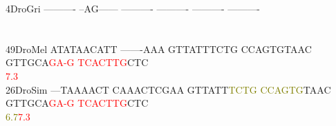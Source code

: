 \documentclass[11pt,twoside,reqno,a4paper]{article}
\begin{document}
{4\hspace*{3\charwidth}DroGri	----------	--AG------	----------	----------	----------	----------	\\
\hspace*{4\charwidth}\hspace*{7\charwidth}\hspace*{1\charwidth}\hspace*{1\charwidth}\hspace*{1\charwidth}\hspace*{1\charwidth}\hspace*{1\charwidth}\hspace*{1\charwidth}\\
\\
49\hspace*{2\charwidth}DroMel	ATATAACATT	-------AAA	GTTATTTCTG	CCAGTGTAAC	GTTGCA\textcolor{red}{G}\textcolor{red}{A}\textcolor{red}{-}\textcolor{red}{G}	\textcolor{red}{T}\textcolor{red}{C}\textcolor{red}{A}\textcolor{red}{C}\textcolor{red}{T}\textcolor{red}{T}\textcolor{red}{G}CTC	\\
\hspace*{4\charwidth}\hspace*{7\charwidth}\hspace*{1\charwidth}\hspace*{1\charwidth}\hspace*{1\charwidth}\hspace*{1\charwidth}\hspace*{46\charwidth}\textcolor{red}{7.3}\hspace*{1\charwidth}\hspace*{1\charwidth}\\
26\hspace*{2\charwidth}DroSim	---TAAAACT	CAAACTCGAA	GTTATT\textcolor{olive}{T}\textcolor{olive}{C}\textcolor{olive}{T}\textcolor{olive}{G}	\textcolor{olive}{C}\textcolor{olive}{C}\textcolor{olive}{A}\textcolor{olive}{G}\textcolor{olive}{T}\textcolor{olive}{G}TAAC	GTTGCA\textcolor{red}{G}\textcolor{red}{A}\textcolor{red}{-}\textcolor{red}{G}	\textcolor{red}{T}\textcolor{red}{C}\textcolor{red}{A}\textcolor{red}{C}\textcolor{red}{T}\textcolor{red}{T}\textcolor{red}{G}CTC	\\
\hspace*{4\charwidth}\hspace*{7\charwidth}\hspace*{1\charwidth}\hspace*{1\charwidth}\hspace*{26\charwidth}\textcolor{olive}{6.7}\hspace*{1\charwidth}\hspace*{1\charwidth}\hspace*{17\charwidth}\textcolor{red}{7.3}\hspace*{1\charwidth}\hspace*{1\charwidth}\\
}
\end{document}

